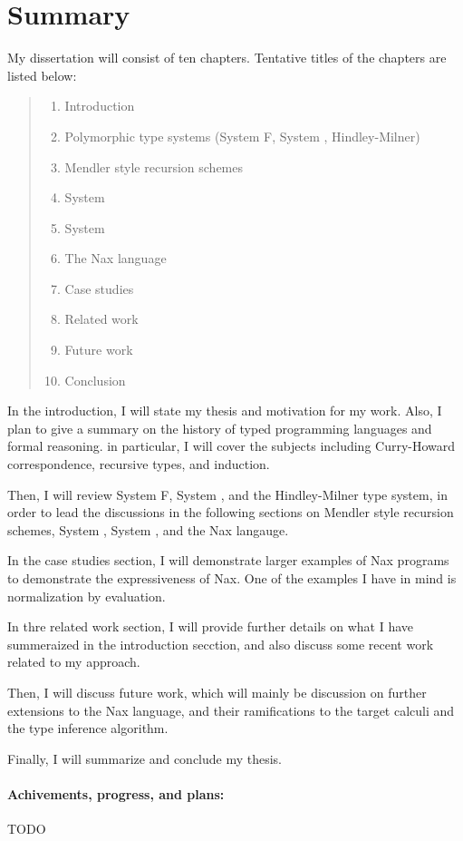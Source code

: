 \section{Summary}\label{sec:summary}
My dissertation will consist of ten chapters.
Tentative titles of the chapters are listed below:
\begin{quote}
\begin{enumerate}[1.]
\item Introduction
\item Polymorphic type systems (System \textsf{F}, System \Fw, Hindley-Milner)
\item Mendler style recursion schemes
\item System \Fi
\item System \Fixi
\item The Nax language
\item Case studies
\item Related work
\item Future work
\item Conclusion
\end{enumerate}
\end{quote}

In the introduction, I will state my thesis and motivation for my work.
Also, I plan to give a summary on the history of typed programming languages
and formal reasoning. in particular, I will cover the subjects including
Curry-Howard correspondence, recursive types, and induction.

Then, I will review System \textsf{F}, System \Fw, and the Hindley-Milner
type system, in order to lead the discussions in the following sections
on Mendler style recursion schemes, System \Fi, System \Fixi, and
the Nax langauge.

In the case studies section, I will demonstrate larger examples of Nax programs
to demonstrate the expressiveness of Nax. One of the examples I have in mind
is normalization by evaluation.

In thre related work section, I will provide further details on what I have
summeraized in the introduction secction, and also discuss some recent work
related to my approach.

Then, I will discuss future work, which will mainly be discussion on further
extensions to the Nax language, and their ramifications to
the target calculi and the type inference algorithm.

Finally, I will summarize and conclude my thesis.

\paragraph{Achivements, progress, and plans:}
TODO

